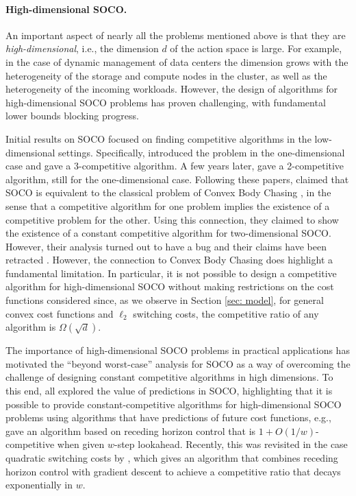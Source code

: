 \paragraph{High-dimensional SOCO.} An important aspect of nearly all the problems mentioned above is that they are \emph{high-dimensional}, i.e., the dimension $d$ of the action space is large.  For example, in the case of dynamic management of data centers the dimension grows with the heterogeneity of the storage and compute nodes in the cluster, as well as the heterogeneity of the incoming workloads. However, the design of algorithms for high-dimensional SOCO problems has proven challenging, with fundamental lower bounds blocking progress.  

Initial results on SOCO focused on finding competitive algorithms in the low-dimensional settings. Specifically, \cite{lin2011} introduced the problem in the one-dimensional case and gave a 3-competitive algorithm.  A few years later, \cite{bansal2015} gave a 2-competitive algorithm, still for the one-dimensional case.  Following these papers, \cite{antoniadis2016} claimed that SOCO is equivalent to the classical problem of Convex Body Chasing \cite{Friedman1993}, in the sense that a competitive algorithm for one problem implies the existence of a competitive problem for the other. Using this connection, they claimed to show the existence of a constant competitive algorithm for two-dimensional SOCO. However, their analysis turned out to have a bug and their claims have been retracted \citep{errata}. 
However, the connection to Convex Body Chasing does highlight a fundamental limitation.  In particular, it is not possible to design a competitive algorithm for high-dimensional SOCO without making restrictions on the cost functions considered since, as we observe in Section \ref{sec: model}, for general convex cost functions and $\ell_2$ switching costs, the competitive ratio of any algorithm is $\Omega(\sqrt{d})$. 

The importance of high-dimensional SOCO problems in practical applications has motivated the ``beyond worst-case'' analysis for SOCO as a way of overcoming the challenge of designing constant competitive algorithms in high dimensions.  To this end, \cite{lin2012, andrew2013, chen2015, badiei2015online, chen2016} all explored the value of predictions in SOCO, highlighting that it is possible to provide constant-competitive algorithms for high-dimensional SOCO problems using algorithms that have predictions of future cost functions, e.g., \cite{lin2012} gave an algorithm based on receding horizon control that is $1+O(1/w)$-competitive when given $w$-step lookahead. Recently, this was revisited in the case quadratic switching costs by \cite{li2018online}, which gives an algorithm that combines receding horizon control with gradient descent to achieve a competitive ratio that decays exponentially in $w$. 

